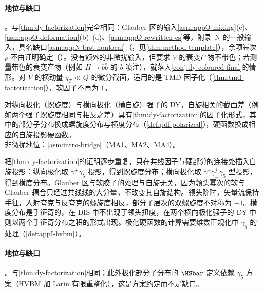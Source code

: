 \paragraph{地位与缺口}\tagA。与\cref{thm:dy-factorization}完全相同：Glauber 区的输入\cref{asm:appO-mixing}(c)、\cref{asm:appO-deformation}(b)--(d)、\cref{asm:appO-rewritten-cs}等，附录~N 的一般输入，具名缺口\cref{asm:appN-brst-nonlocal}（\tagC，见\cref{thm:method-template}），余项幂次 $p$ 不由证明确定（\tagC）。没有额外的非微扰输入，但要求 $V$ 的衰变产物不带色；若测量带色的衰变产物（例如 $H\to b\bar b$ 的 $b$ 喷注），就落入\cref{conj:dy-coloured-final}的情形。对 $V$ 的横动量 $q_T\ll Q$ 的微分截面，适用的是 TMD 因子化（\cref{thm:tmd-factorization}），软因子不再为 $1$。

\begin{theorem}\label{thm:dy-polarized}
对纵向极化（螺旋度）与横向极化（横自旋）强子的 DY，自旋相关的截面差（例如两个强子螺旋度相同与相反之差）具有\cref{thm:dy-factorization}的因子化形式，其中的部分子分布换成螺旋度分布与横度分布（\cref{def:pdf-polarized}），硬函数换成相应的自旋投影硬函数。\\
非微扰地位：\cref{asm:intro-bridge}（MA1、MA2、MA4）。
\end{theorem}

\begin{proofsketch}
把\cref{thm:dy-factorization}的证明逐步重复，只在共线因子与硬部分的连接处插入自旋投影：纵向极化取 $\gamma^+\gamma_5$ 投影，得到螺旋度分布；横向极化取 $\gamma^+\gamma^j_\perp\gamma_5$ 型投影，得到横度分布。Glauber 区与软胶子的处理与自旋无关，因为领头幂次的软与 Glauber 耦合只经过共线线的大分量，不改变其自旋结构。领头阶时，矢量流保持手征，入射夸克与反夸克的螺旋度相反，部分子层次的双螺旋度不对称为 $-1$。横度分布是手征奇的，在 DIS 中不出现于领头扭度，在两个横向极化强子的 DY 中则以两个手征奇分布之积的形式出现\cite{RalstonSoper1979,JaffeJi1991}。极化硬函数的计算需要维数正规化中 $\gamma_5$ 的处理（\cref{def:appI-hvbm}）。
\end{proofsketch}

\paragraph{地位与缺口}\tagA。与\cref{thm:dy-factorization}相同；此外极化部分子分布的 $\MSbar$ 定义依赖 $\gamma_5$ 方案（HVBM 加 Larin 有限重整化），这是方案约定而不是缺口。

